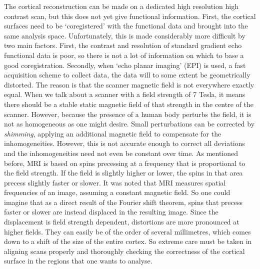 The cortical reconstruction can be made on a dedicated high resolution high contrast scan, but this does not yet give functional information. First, the cortical surfaces need to be `coregistered' with the functional data and brought into the same analysis space. Unfortunately, this is made considerably more difficult by two main factors. First, the contrast and resolution of standard gradient echo functional data is poor, so there is not a lot of information on which to base a good coregistration. Secondly, when `echo planar imaging' (EPI) is used, a fast acquisition scheme to collect data, the data will to some extent be geometrically distorted. The reason is that the scanner magnetic field is not everywhere exactly equal. When we talk about a scanner with a field strength of 7 Tesla, it means there should be a stable static magnetic field of that strength in the centre of the scanner. However, because the presence of a human body perturbs the field, it is not as homogeneous as one might desire. Small perturbations can be corrected by \emph{shimming}, applying an additional magnetic field to compensate for the inhomogeneities. However, this is not accurate enough to correct all deviations and the inhomogeneities need not even be constant over time. As mentioned before, MRI is based on spins precessing at a frequency that is proportional to the field strength.
If the field is slightly higher or lower, the spins in that area precess slightly faster or slower. It was noted that MRI measures spatial frequencies of an image, assuming a constant magnetic field. So one could imagine that as a direct result of the Fourier shift theorem, spins that precess faster or slower are instead displaced in the resulting image. Since the displacement is field strength dependent, distortions are more pronounced at higher fields. They can easily be of the order of several millimetres, which comes down to a shift of the size of the entire cortex. So extreme care must be taken in aligning scans properly and thoroughly checking the correctness of the cortical surface in the regions that one wants to analyse.


